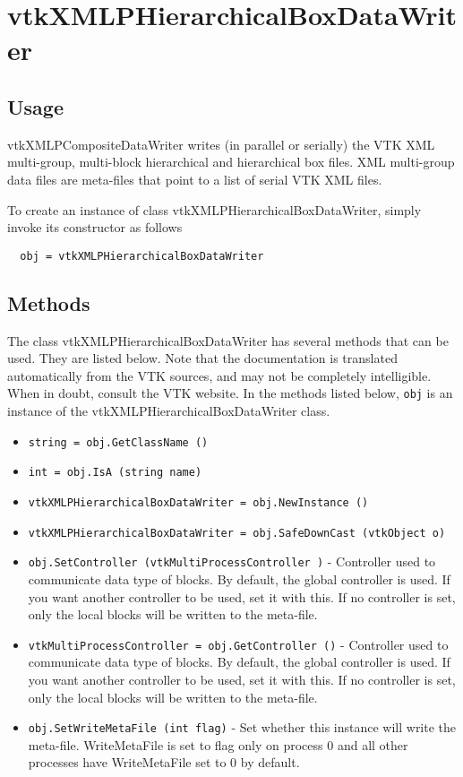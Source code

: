 \section{vtkXMLPHierarchicalBoxDataWriter}

\subsection{Usage}

 vtkXMLPCompositeDataWriter writes (in parallel or serially) the VTK XML
 multi-group, multi-block hierarchical and hierarchical box files. XML
 multi-group data files are meta-files that point to a list of serial VTK
 XML files.

To create an instance of class vtkXMLPHierarchicalBoxDataWriter, simply
invoke its constructor as follows
\begin{verbatim}
  obj = vtkXMLPHierarchicalBoxDataWriter
\end{verbatim}
\subsection{Methods}

The class vtkXMLPHierarchicalBoxDataWriter has several methods that can be used.
  They are listed below.
Note that the documentation is translated automatically from the VTK sources,
and may not be completely intelligible.  When in doubt, consult the VTK website.
In the methods listed below, \verb|obj| is an instance of the vtkXMLPHierarchicalBoxDataWriter class.
\begin{itemize}
\item  \verb|string = obj.GetClassName ()|

\item  \verb|int = obj.IsA (string name)|

\item  \verb|vtkXMLPHierarchicalBoxDataWriter = obj.NewInstance ()|

\item  \verb|vtkXMLPHierarchicalBoxDataWriter = obj.SafeDownCast (vtkObject o)|

\item  \verb|obj.SetController (vtkMultiProcessController )| -  Controller used to communicate data type of blocks.
 By default, the global controller is used. If you want another
 controller to be used, set it with this.
 If no controller is set, only the local blocks will be written
 to the meta-file.

\item  \verb|vtkMultiProcessController = obj.GetController ()| -  Controller used to communicate data type of blocks.
 By default, the global controller is used. If you want another
 controller to be used, set it with this.
 If no controller is set, only the local blocks will be written
 to the meta-file.

\item  \verb|obj.SetWriteMetaFile (int flag)| -  Set whether this instance will write the meta-file. WriteMetaFile
 is set to flag only on process 0 and all other processes have
 WriteMetaFile set to 0 by default.

\end{itemize}
